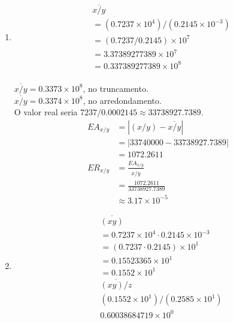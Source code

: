\documentclass{article}
\begin{document}
\begin{enumerate}
\begin{enumerate}
    $\overline{x-y-z} = 0.7234 \times 10^{4}$, no arredondamento e truncamento. \\

    O valor real seria $7237-0.0002145-2.585=7234.4147855$. Vamos calcular o erro relativo.
    \begin{align*}
        EA_{x-y-z} &= |(x-y-z) - \overline{x-y-z}|\\
        &=|7234.4147855 - 7234|\\
        &=0.4147855\\
        ER_{x+y+z} &= \frac{EA_{x+y+z}}{\overline{x+y+z}}\\
        &=\frac{0.4147855}{7234.4147855}\\
        &\approx 5.73\times 10^{-5}
    \end{align*}
    \item 
    \begin{align*}
        &\overline{x / y} \\
        &=(0.7237 \times 10^{4}) / (0.2145 \times 10^{-3})\\
        &=(0.7237/0.2145) \times 10^{7} \\
        &=3.37389277389\times 10^{7}\\
        &=0.337389277389\times 10^{8}\\
    \end{align*}

    $\overline{x/y} = 0.3373\times 10^{8}$, no truncamento. \\
    $\overline{x/y} = 0.3374\times 10^{8}$, no arredondamento. \\
    
    O valor real seria $7237/0.0002145 \approx 33738927.7389$.\\

    \begin{align*}
        EA_{x/y} &= |(x/y) - \overline{x/y}|\\
        &=|33740000 - 33738927.7389|\\
        &=1072.2611\\
        ER_{x/y} &= \frac{EA_{x/y}}{\overline{x/y}}\\
        &=\frac{1072.2611}{33738927.7389}\\
        &\approx 3.17\times 10^{-5}
    \end{align*}
    \item 
    \begin{align*}
        &\overline{(xy)}\\
        &=0.7237 \times 10^{4} \cdot 0.2145 \times 10^{-3}\\
        &=(0.7237\cdot0.2145) \times 10^{1}\\
        &=0.15523365 \times 10^{1} \\
        &=0.1552 \times 10^{1} \\
        &\overline{(xy)/z}\\
        & (0.1552 \times 10^{1}) / (0.2585 \times 10^{1}) \\
        & 0.60038684719 \times 10^{0}
    \end{align*}
    

\end{enumerate}
\end{enumerate}
\end{document}
